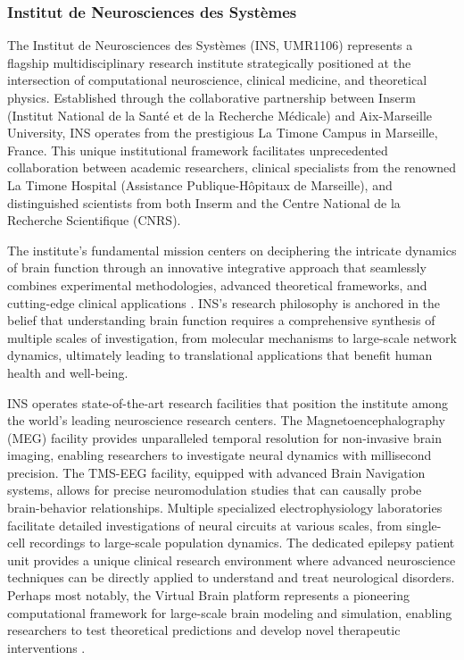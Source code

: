 \documentclass[a4paper,12pt,twoside]{article}
\begin{document}
\subsubsection{Institut de Neurosciences des Systèmes}
The Institut de Neurosciences des Systèmes (INS, UMR1106) represents a flagship multidisciplinary research institute strategically positioned at the intersection of computational neuroscience, clinical medicine, and theoretical physics. Established through the collaborative partnership between Inserm (Institut National de la Santé et de la Recherche Médicale) and Aix-Marseille University, INS operates from the prestigious La Timone Campus in Marseille, France. This unique institutional framework facilitates unprecedented collaboration between academic researchers, clinical specialists from the renowned La Timone Hospital (Assistance Publique-Hôpitaux de Marseille), and distinguished scientists from both Inserm and the Centre National de la Recherche Scientifique (CNRS).

The institute's fundamental mission centers on deciphering the intricate dynamics of brain function through an innovative integrative approach that seamlessly combines experimental methodologies, advanced theoretical frameworks, and cutting-edge clinical applications \cite{frauscher2018atlas}. INS's research philosophy is anchored in the belief that understanding brain function requires a comprehensive synthesis of multiple scales of investigation, from molecular mechanisms to large-scale network dynamics, ultimately leading to translational applications that benefit human health and well-being.

INS operates state-of-the-art research facilities that position the institute among the world's leading neuroscience research centers. The Magnetoencephalography (MEG) facility provides unparalleled temporal resolution for non-invasive brain imaging, enabling researchers to investigate neural dynamics with millisecond precision. The TMS-EEG facility, equipped with advanced Brain Navigation systems, allows for precise neuromodulation studies that can causally probe brain-behavior relationships. Multiple specialized electrophysiology laboratories facilitate detailed investigations of neural circuits at various scales, from single-cell recordings to large-scale population dynamics. The dedicated epilepsy patient unit provides a unique clinical research environment where advanced neuroscience techniques can be directly applied to understand and treat neurological disorders. Perhaps most notably, the Virtual Brain platform represents a pioneering computational framework for large-scale brain modeling and simulation, enabling researchers to test theoretical predictions and develop novel therapeutic interventions \cite{brunton2016discovering}.
\end{document}
